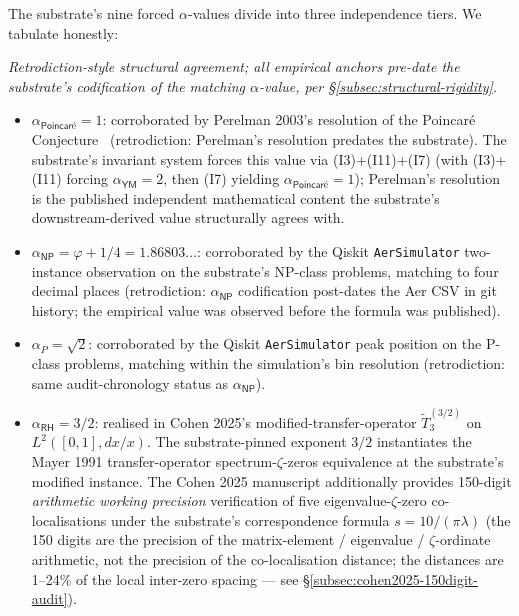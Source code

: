 \documentclass[11pt,a4paper]{amsart}
\theoremstyle{plain}
\theoremstyle{definition}
\begin{document}
The substrate's nine forced $\alpha$-values divide into three independence tiers. We tabulate honestly:

\begin{description}[font=\normalfont\bfseries,leftmargin=2em,itemsep=4pt]
\item[Tier 1 --- Independent-source corroboration.] \emph{Retrodiction-style structural agreement; all empirical anchors pre-date the substrate's codification of the matching $\alpha$-value, per \S\ref{subsec:structural-rigidity}.}
\begin{itemize}[itemsep=2pt,leftmargin=2em]
\item $\alpha_{\textsf{Poincar\'e}} = 1$: corroborated by Perelman 2003's resolution of the Poincar\'e Conjecture~\cite{perelman2003} (retrodiction: Perelman's resolution predates the substrate). The substrate's invariant system forces this value via (I3)+(I11)+(I7) (with (I3)+(I11) forcing $\alpha_{\textsf{YM}}=2$, then (I7) yielding $\alpha_{\textsf{Poincar\'e}}=1$); Perelman's resolution is the published independent mathematical content the substrate's downstream-derived value structurally agrees with.
\item $\alpha_{\textsf{NP}} = \varphi + 1/4 = 1.86803\ldots$: corroborated by the Qiskit \texttt{AerSimulator} two-instance observation on the substrate's NP-class problems, matching to four decimal places (retrodiction: $\alpha_{\textsf{NP}}$ codification post-dates the Aer CSV in git history; the empirical value was observed before the formula was published).
\item $\alpha_{P} = \sqrt{2}$: corroborated by the Qiskit \texttt{AerSimulator} peak position on the P-class problems, matching within the simulation's bin resolution (retrodiction: same audit-chronology status as $\alpha_{\textsf{NP}}$).
\end{itemize}
\item[Tier 2 — Structural / framework-bridging corroboration.]
\begin{itemize}[itemsep=2pt,leftmargin=2em]
\item $\alpha_{\textsf{RH}} = 3/2$: realised in Cohen 2025's modified-transfer-operator $\widetilde{T}_3^{(3/2)}$ on $L^2([0,1], dx/x)$. The substrate-pinned exponent $3/2$ instantiates the Mayer 1991 transfer-operator spectrum-$\zeta$-zeros equivalence at the substrate's modified instance. The Cohen 2025 manuscript additionally provides 150-digit \emph{arithmetic working precision} verification of five eigenvalue-$\zeta$-zero co-localisations under the substrate's correspondence formula $s = 10/(\pi\lambda)$ (the 150 digits are the precision of the matrix-element / eigenvalue / $\zeta$-ordinate arithmetic, not the precision of the co-localisation distance; the distances are 1--24\% of the local inter-zero spacing --- see \S\ref{subsec:cohen2025-150digit-audit}).

\end{itemize}
\end{description}
\end{document}
